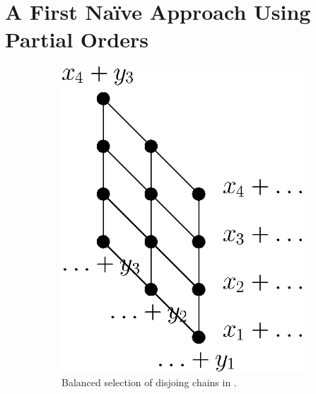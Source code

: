 \section{A First Naïve Approach Using Partial Orders}

\begin{figure}
\centering
\begin{subfigure}[b]{0.4\textwidth}
	\includegraphics[width=\textwidth]{fig/open/x+y}
	\caption{Balanced selection of disjoing chains in \XY.}
	\label{fig:xy:poset:chains}
\end{subfigure}
\begin{subfigure}[b]{0.4\textwidth}

\end{subfigure}
\end{figure}
